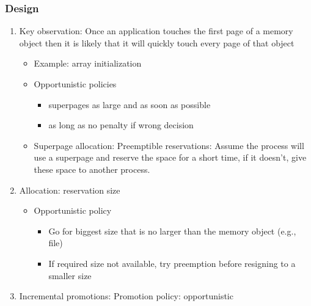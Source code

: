 \documentclass[12pt]{article}
\begin{document}
\subsubsection{Design}
\begin{enumerate}
    \item Key observation: Once an application touches the first page of a memory object then it is likely that it will quickly touch every page of that object \begin{itemize}
        \item Example: array initialization
        \item Opportunistic policies \begin{itemize}
            \item superpages as large and as soon as possible
            \item as long as no penalty if wrong decision
        \end{itemize}
        \item Superpage allocation: Preemptible reservations: Assume the process will use a superpage and reserve the space for a short time, if it doesn't, give these space to another process.
    \end{itemize}
    \item Allocation: reservation size \begin{itemize}
        \item Opportunistic policy \begin{itemize}
            \item Go for biggest size that is no larger than the memory object (e.g., file)
            \item If required size not available, try preemption before resigning to a smaller size
        \end{itemize}
    \end{itemize}
    \item Incremental promotions: Promotion policy: opportunistic
\end{enumerate}
\end{document}
